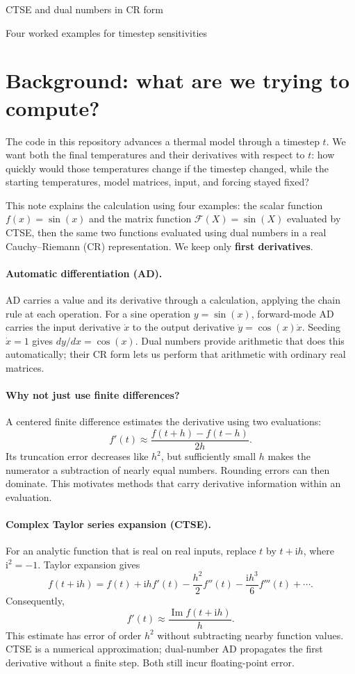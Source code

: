 \documentclass[11pt]{article}
\newcommand{\ii}{\mathrm i}
\begin{document}
\begin{center}
{\LARGE CTSE and dual numbers in CR form\par}
\smallskip
{\large Four worked examples for timestep sensitivities\par}
\end{center}

\section*{Background: what are we trying to compute?}
The code in this repository advances a thermal model through a timestep $t$.
We want both the final temperatures and their derivatives with respect to $t$:
how quickly would those temperatures change if the timestep changed, while
the starting temperatures, model matrices, input, and forcing stayed fixed?

This note explains the calculation using four examples: the scalar function
$f(x)=\sin(x)$ and the matrix function $\mathcal F(X)=\sin(X)$ evaluated by
CTSE, then the same two functions evaluated
using dual numbers in a real Cauchy--Riemann (CR) representation. We keep only
\textbf{first derivatives}.

\paragraph{Automatic differentiation (AD).}
AD carries a value and its derivative through a calculation, applying the
chain rule at each operation. For a sine operation $y=\sin(x)$, forward-mode
AD carries the input derivative $\dot x$ to the output derivative
$\dot y=\cos(x)\dot x$. Seeding $\dot x=1$ gives $dy/dx=\cos(x)$.
Dual numbers provide arithmetic that does this automatically; their CR form
lets us perform that arithmetic with ordinary real matrices.

\paragraph{Why not just use finite differences?}
A centered finite difference estimates the derivative using two evaluations:
\[
 f'(t)\approx\frac{f(t+h)-f(t-h)}{2h}.
\]
Its truncation error decreases like $h^2$, but sufficiently small $h$ makes
the numerator a subtraction of nearly equal numbers. Rounding errors can
then dominate. This motivates methods that carry derivative information
within an evaluation.

\paragraph{Complex Taylor series expansion (CTSE).}
For an analytic function that is real on real inputs, replace $t$ by $t+\ii h$,
where $\ii^2=-1$. Taylor expansion gives
\[
 f(t+\ii h)=f(t)+\ii h f'(t)-\frac{h^2}{2}f''(t)
              -\frac{\ii h^3}{6}f'''(t)+\cdots.
\]
Consequently,
\[
 \boxed{f'(t)\approx\frac{\operatorname{Im}f(t+\ii h)}{h}}.
\]
This estimate has error of order $h^2$ without subtracting nearby function
values. CTSE is a numerical approximation; dual-number AD propagates the
first derivative without a finite step. Both still incur floating-point error.
\end{document}
